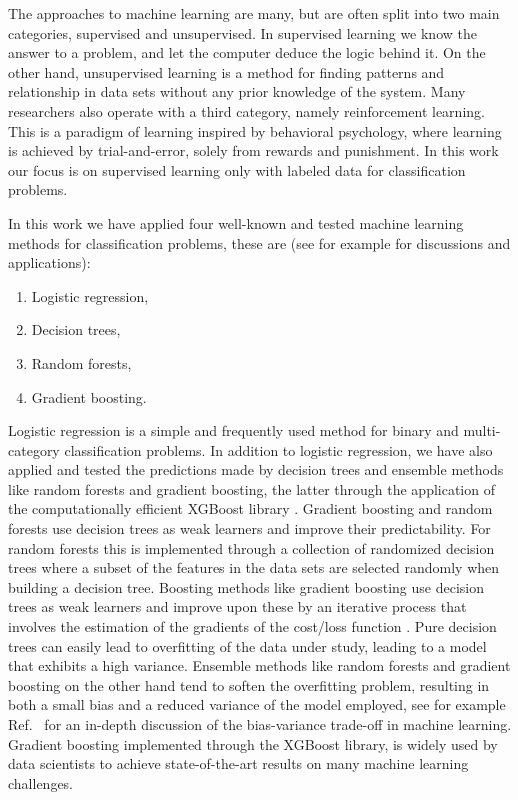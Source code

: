 \documentclass[superscriptaddress,unsortedaddress,
 amsmath,amssymb,
 aps,
]{revtex4-2}
\begin{document}
The approaches to machine learning are many, but are often split into two main categories, supervised and unsupervised. In supervised learning we know the answer to a problem, and let the computer deduce the logic behind it. On the other hand, unsupervised learning is a method for finding patterns and relationship in data sets without any prior knowledge of the system. Many researchers also operate with a third category, namely reinforcement learning. This is a paradigm of learning inspired by behavioral psychology, where learning is achieved by trial-and-error, solely from rewards and punishment. In this work our focus is on supervised learning only with labeled data for classification problems.

In this work we have applied four well-known and tested machine learning methods for classification problems, these are (see for example \cite{Hastie2009,Mehta2019} for discussions and applications):
\begin{enumerate}
    \item Logistic regression,
    \item Decision trees,
    \item Random forests,
    \item Gradient boosting.
\end{enumerate}
Logistic regression \cite{Hastie2009} is a simple and frequently used method for binary and multi-category classification problems.  In addition to logistic regression, we have also applied and tested the predictions made by decision trees and ensemble methods like random forests and gradient boosting, the latter through the application of the computationally efficient  XGBoost library \cite{xgboost2016}. Gradient boosting and random forests use decision trees as weak learners and improve their predictability. For random forests this is implemented through a collection of randomized decision trees where a  subset of the features in the data sets are selected randomly when building a decision tree. Boosting methods like gradient boosting use decision trees as  weak learners and improve upon these by an iterative process that involves the estimation of the gradients of the cost/loss function \cite{Hastie2009}. Pure decision trees can easily lead to overfitting of the data under study, leading to a model that exhibits a high variance. Ensemble methods like random forests and gradient boosting on the other hand tend to soften the overfitting problem, resulting in both a small bias and a reduced variance of the model employed, see for example Ref.~\cite{Mehta2019} for an in-depth discussion of the bias-variance trade-off in machine learning. Gradient boosting implemented through the  XGBoost library, is widely used by data scientists to achieve state-of-the-art results on many machine learning challenges.
\end{document}
